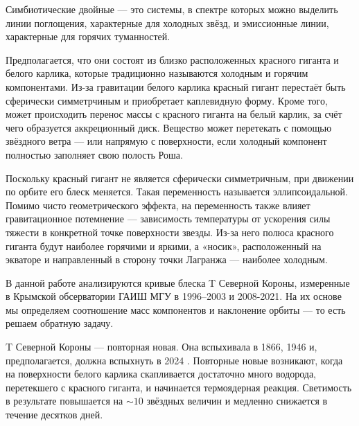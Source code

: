 

\usepackage{microtype}
\usepackage[extdef]{delimset}
\usepackage{csquotes} %
\usepackage{ragged2e}
\usepackage[hidelinks]{hyperref}
\usepackage{subfig}
\usepackage{tabularray}


\renewcommand{\div}{\operatorname{div}}




\setcounter{page}{2}




Симбиотические двойные — это системы, в спектре которых можно выделить линии поглощения, характерные для холодных звёзд, и эмиссионные линии, характерные для горячих туманностей.

Предполагается, что они состоят из близко расположенных красного гиганта и белого карлика, которые традиционно называются холодным и горячим компонентами. Из-за гравитации белого карлика красный гигант перестаёт быть сферически симметрчиным и приобретает каплевидную форму. Кроме того, может происходить перенос массы с красного гиганта на белый карлик, за счёт чего образуется аккреционный диск. Вещество может перетекать с помощью звёздного ветра --- или напрямую с поверхности, если холодный компонент полностью заполняет свою полость Роша.

Поскольку красный гигант не является сферически симметричным, при движении по орбите его блеск меняется. Такая переменность называется эллипсоидальной. Помимо чисто геометрического эффекта, на переменность также влияет гравитационное потемнение --- зависимость температуры от ускорения силы тяжести в конкретной точке поверхности звезды. Из-за него полюса красного гиганта будут наиболее горячими и яркими, а «носик», расположенный на экваторе и направленный в сторону точки Лагранжа --- наиболее холодным.

В данной работе анализируются кривые блеска T Северной Короны, измеренные в Крымской обсерватории ГАИШ МГУ в 1996--2003 и 2008-2021. На их основе мы определяем соотношение масс компонентов и наклонение орбиты — то есть решаем обратную задачу.

T Северной Короны --- повторная новая. Она вспыхивала в 1866, 1946 и, предполагается, должна вспыхнуть в 2024 \cite{OutburstAnnounce}. Повторные новые возникают, когда на поверхности белого карлика скапливается достаточно много водорода, перетекшего с красного гиганта, и начинается термоядерная реакция. Светимость в результате повышается на ${\sim} 10$ звёздных величин и медленно снижается в течение десятков дней.


